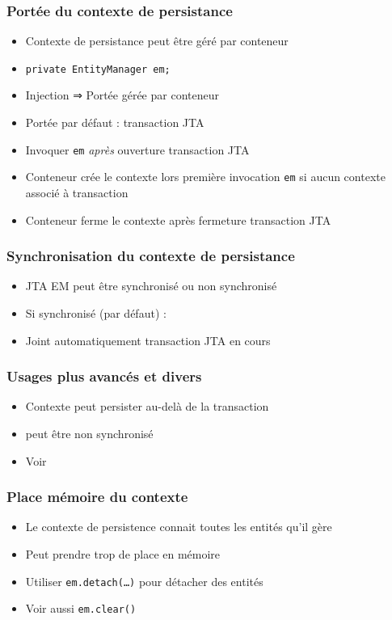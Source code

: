 \documentclass[french, english]{beamer}
\begin{document}
\begin{frame}
	\frametitle{Portée du contexte de persistance}
	\begin{itemize}
		\item Contexte de persistance peut être géré par conteneur
		\item {} \texttt{private EntityManager em;}
		\item Injection ⇒ Portée gérée par conteneur
		\item Portée par défaut : transaction JTA
		\item Invoquer \texttt{em} \emph{après} ouverture transaction JTA
		\item Conteneur crée le contexte lors première invocation \texttt{em} {\tiny si aucun contexte associé à transaction}
		\item Conteneur ferme le contexte après fermeture transaction JTA
	\end{itemize}
\end{frame}

\begin{frame}
	\frametitle{Synchronisation du contexte de persistance}
	\begin{itemize}
		\item JTA EM peut être synchronisé ou non synchronisé
		\item Si synchronisé (par défaut) :
		\item Joint automatiquement transaction JTA en cours
	\end{itemize}
\end{frame}

\begin{frame}
	\frametitle{Usages plus avancés et divers}
	\begin{itemize}
		\item Contexte peut persister au-delà de la transaction
		\item peut être non synchronisé
		\item Voir 
	\end{itemize}
\end{frame}

\begin{frame}
	\frametitle{Place mémoire du contexte}
	\begin{itemize}
		\item Le contexte de persistence connait toutes les entités qu’il gère
		\item Peut prendre trop de place en mémoire
		\item Utiliser \texttt{em.detach(…)} pour détacher des entités
		\item Voir aussi \texttt{em.clear()}
	\end{itemize}
\end{frame}
\end{document}

